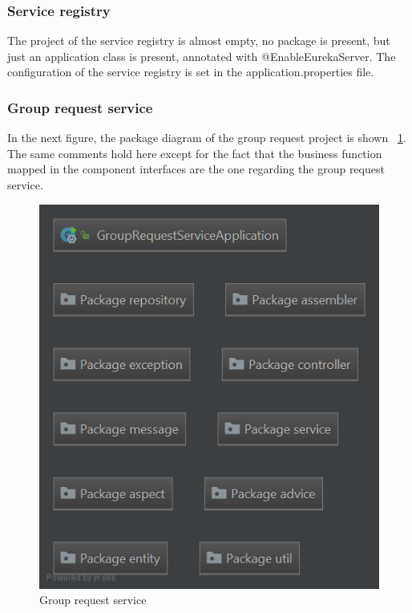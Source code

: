 \subsubsection{Service registry}
The project of the service registry is almost empty, no package is present, but just an application class is present, annotated with 
@EnableEurekaServer. The configuration of the service registry is set in the application.properties file.

\subsubsection{Group request service}
In the next figure, the package diagram of the group request project is shown ~\ref{fig:pkggrouprequest}. \\
The same comments hold here except for the fact that the business function mapped in the component interfaces are the one regarding
the group request service. 

\begin{figure}[H]
\includegraphics[width=\linewidth]{images/PackageGrouprequestservice.png}
\caption{ Group request service }
\label{fig:pkggrouprequest}
\end{figure}

